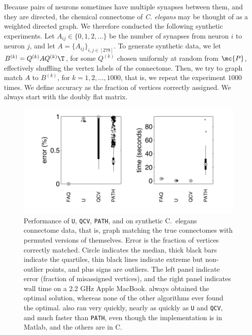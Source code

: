 \documentclass[11pt]{article}
\begin{document}
Because pairs of neurons sometimes have multiple synapses between them, and they are directed, the chemical connectome of \emph{C. elegans} may be thought of as a weighted directed graph.
We therefore conducted the following synthetic experiments.  
Let $A_{ij} \in \{0,1,2,\ldots\}$ be the number of synapses from neuron $i$ to neuron $j$, and let $A=\{A_{ij}\}_{i,j \in [279]}$.  To generate synthetic data, we let $B^{(k)}=Q^{(k)} A {Q^{(k)}}\T$, for some $Q^{(k)}$ chosen uniformly at random from $\mc{P}$, effectively shuffling the vertex labels of the connectome.  Then, we try to graph match $A$ to $B^{(k)}$, for  $k =1,2,\ldots, 1000$, that is, we repeat the experiment $1000$ times.  We define accuracy as the fraction of vertices correctly assigned. We always start with the doubly flat matrix.


\begin{figure}[htbp]
	\centering
		\includegraphics[width=0.5\linewidth]{../figs/chemicalConnectome.pdf}
	\caption{Performance of \texttt{U}, \texttt{QCV}, \texttt{PATH}, and \FAQ on synthetic C.~elegans connectome data, that is, graph matching the true connectomes with permuted versions of themselves.  Error is the fraction of vertices correctly matched.  Circle indicates the median, thick black bars indicate the quartiles, thin black lines indicate extreme but non-outlier points, and plus signs are outliers. The left panel indicate error (fraction of misassigned vertices), and the right panel indicates wall time on a 2.2 GHz Apple MacBook.   \FAQ always obtained the optimal solution, whereas none of the other algorithms ever found the optimal.    \FAQ also ran very quickly, nearly as quickly as \texttt{U} and \texttt{QCV}, and much faster than \texttt{PATH}, even though the \FAQ implementation is in Matlab, and the others are in C.}
	\label{fig:connectomes}
\end{figure}
\end{document}
